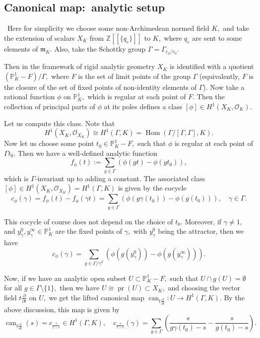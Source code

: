 \documentclass[11pt,leqno]{amsart}
\numberwithin{equation}{section}
\def\Z{\mathbb{Z}}
\def\PP{{\mathbb P}}
\def\Hom{\operatorname{Hom}}
\newcommand{\can}{\operatorname{can}}
\newcommand{\cO}{{\mathcal O}}
\newcommand{\pr}{\operatorname{pr}}
\newcommand{\m}{\mathfrak{m}}
\begin{document}
\subsection{Canonical map:\ analytic setup} \ Here for simplicity we choose some
non-Archimedean normed field $K,$ and take the extension of scalars $X_K$ from $\Z[[\{q_{e}\}]]$ to $K,$ where $q_{e}$ are sent to some elements of $\m_K.$ Also, take the Schottky group $\Gamma=\Gamma_{e_0/v_0}.$

Then in the framework of rigid analytic geometry $X_K$ is identified with a quotient $(\PP^1_K-F)/\Gamma,$ where $F$ is the set of limit points of the group $\Gamma$ (equivalently, $F$ is the closure of the set of fixed points of non-identity elements of $\Gamma$). Now take a rational function $\phi$ on $\PP^1_K,$ which is regular at each point of $F.$ Then the collection of principal parts of $\phi$ at its poles defines a class $[\phi]\in H^1(X_K,\cO_K).$

Let us compute this class. Note that $$H^1(X_K,\cO_{X_K})\cong H^1(\Gamma,K)=\Hom(\Gamma/[\Gamma,\Gamma],K).$$ 
Now let us choose some point $t_0\in \PP^1_K-F,$ such that $\phi$ is regular at each point of $\Gamma t_0.$ Then we have a well-defined analytic function $$f_{\phi}(t):=\sum\limits_{g\in\Gamma} (\phi(gt)-\phi(gt_0)),$$
which is $\Gamma$-invariant up to adding a constant.
The associated class $[\phi]\in H^1(X_K,\cO_{X_K})=H^1(\Gamma,K)$ is given by  the cocycle \begin{equation}c_{\phi}(\gamma)=f_{\phi}(t)-f_{\phi}(\gamma t)=\sum\limits_{g\in\Gamma}(\phi(g\gamma(t_0))-\phi(g(t_0))),\quad \gamma\in\Gamma.\end{equation}

This cocycle of course does not depend on the choice of $t_0.$ Moreover, if $\gamma\ne 1,$ and $y_{\gamma}^0,y_{\gamma}^{\infty}\in \PP^1_K$ are the fixed points of $\gamma,$ with $y_{\gamma}^0$ being the attractor, then we have
\begin{equation}c_{\phi}(\gamma)=\sum\limits_{\bar{g}\in\Gamma/\gamma^{\Z}}(\phi(g(y_{\gamma}^0))-\phi(g(y_{\gamma}^{\infty}))).\end{equation}

Now, if we have an analytic open subset $U\subset \PP^1_K-F,$ such that $U\cap g(U)=\emptyset$ for all $g\in\Gamma\setminus\{1\},$ then we have $U\cong \pr(U)\subset X_K,$ and choosing the vector field $t\frac{\partial}{\partial t}$ on $U,$ we get the lifted canonical map $\can_{t\frac{\partial}{\partial t}}:U\to H^1(\Gamma,K).$ By the above discussion, this map is 
given by 
\begin{equation}\label{eq:can_map_analytic}\can_{t\frac{\partial}{\partial t}}(s)=c_{\frac{s}{t-s}}\in H^1(\Gamma,K),\quad c_{\frac{s}{t-s}}(\gamma)=\sum\limits_{g\in\Gamma}(\frac{s}{g\gamma(t_0)-s}-\frac{s}{g(t_0)-s}).\end{equation}
\end{document}
